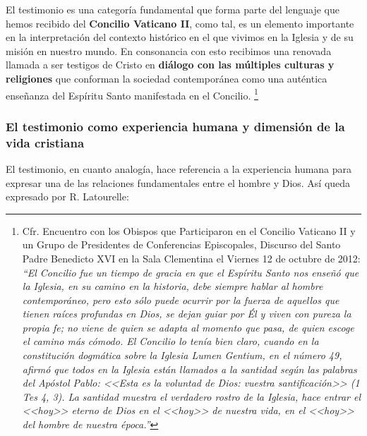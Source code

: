 \documentclass[12pt]{article}
\begin{document}
El testimonio es una categoría fundamental que forma parte del lenguaje que hemos recibido del \textbf{Concilio Vaticano II}, como tal, es un elemento importante en la interpretación del contexto histórico en el que vivimos en la Iglesia y de su misión en nuestro mundo. En consonancia con esto recibimos una renovada llamada a ser testigos de Cristo en \textbf{diálogo con las múltiples culturas y religiones} que conforman la sociedad contemporánea como una auténtica enseñanza del Espíritu Santo manifestada en el Concilio.
\footnote{ 
Cfr. Encuentro con los Obispos que Participaron en el Concilio Vaticano II y un Grupo de Presidentes de Conferencias Episcopales, Discurso del Santo Padre Benedicto XVI en la Sala Clementina el Viernes 12 de octubre de 2012:
\emph{ ``El Concilio fue un tiempo de gracia en que el Espíritu Santo nos enseñó que la Iglesia, en su camino en la historia, debe siempre hablar al hombre contemporáneo, pero esto sólo puede ocurrir por la fuerza de aquellos que tienen raíces profundas en Dios, se dejan guiar por Él y viven con pureza la propia fe; no viene de quien se adapta al momento que pasa, de quien escoge el camino más cómodo. El Concilio lo tenía bien claro, cuando en la constitución dogmática sobre la Iglesia Lumen Gentium, en el número 49, afirmó que todos en la Iglesia están llamados a la santidad según las palabras del Apóstol Pablo: <<Esta es la voluntad de Dios: vuestra santificación>> (1 Tes 4, 3). La santidad muestra el verdadero rostro de la Iglesia, hace entrar el <<hoy>> eterno de Dios en el <<hoy>> de nuestra vida, en el <<hoy>> del hombre de nuestra época.''
}
}

\subsubsection{El testimonio como experiencia humana y dimensión de la vida cristiana}

El testimonio, en cuanto analogía, hace referencia a la experiencia humana para expresar una de las relaciones fundamentales entre el hombre y Dios. Así queda expresado por R. Latourelle:
\end{document}
